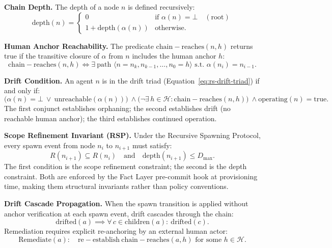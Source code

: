 \medskip
\noindent\textbf{Chain Depth.}
The depth of a node $n$ is defined recursively:
\begin{equation}
\mathrm{depth}(n) = 
\begin{cases}
0 & \text{if } \alpha(n) = \bot \quad (\text{root}) \\
1 + \mathrm{depth}(\alpha(n)) & \text{otherwise}.
\end{cases}
\label{eq:rs-depth}
\end{equation}

\medskip
\noindent\textbf{Human Anchor Reachability.}
The predicate $\mathrm{chain-reaches}(n, h)$ returns true if the transitive closure of $\alpha$ from $n$ includes the human anchor $h$:
\begin{equation}
\mathrm{chain-reaches}(n, h) \iff \exists\ \text{path } \langle n = n_k, n_{k-1}, \ldots, n_0 = h \rangle \text{ s.t. } \alpha(n_i) = n_{i-1}.
\label{eq:rs-chain-reaches}
\end{equation}

\medskip
\noindent\textbf{Drift Condition.}
An agent $n$ is in the drift triad (Equation~\ref{eq:rs-drift-triad}) if and only if:
\begin{equation}
\bigl( \alpha(n) = \bot \ \lor \ \mathrm{unreachable}(\alpha(n)) \bigr)\ \land \bigl( \neg\exists\, h \in \mathcal{H} : \mathrm{chain-reaches}(n, h) \bigr)\ \land \mathrm{operating}(n) = \mathrm{true}.
\label{eq:rs-drift-condition}
\end{equation}
The first conjunct establishes orphaning; the second establishes drift (no reachable human anchor); the third establishes continued operation.

\medskip
\noindent\textbf{Scope Refinement Invariant (RSP).}
Under the Recursive Spawning Protocol, every spawn event from node $n_i$ to $n_{i+1}$ must satisfy:
\begin{equation}
R(n_{i+1}) \subseteq R(n_i) \quad \text{and} \quad \mathrm{depth}(n_{i+1}) \leq D_{\max}.
\label{eq:rs-scope-refinement}
\end{equation}
The first condition is the scope refinement constraint; the second is the depth constraint. Both are enforced by the Fact Layer pre-commit hook at provisioning time, making them structural invariants rather than policy conventions.

\medskip
\noindent\textbf{Drift Cascade Propagation.}
When the spawn transition is applied without anchor verification at each spawn event, drift cascades through the chain:
\begin{equation}
\mathrm{drifted}(a) \implies \forall\, c \in \mathrm{children}(a):\ \mathrm{drifted}(c).
\label{eq:rs-drift-propagation}
\end{equation}
Remediation requires explicit re-anchoring by an external human actor:
\begin{equation}
\mathrm{Remediate}(a):\quad \mathrm{re-establish}\ \mathrm{chain-reaches}(a, h) \text{ for some } h \in \mathcal{H}.
\label{eq:rs-drift-remediation}
\end{equation}

